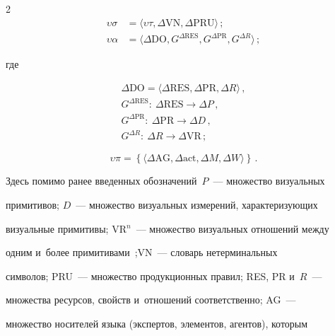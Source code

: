 \begin{multicols}{2}
\begin{align}
   \upsilon\sigma &= \langle \upsilon\tau, \Delta \mathrm{VN}, \Delta \mathrm{PRU}\rangle\,;\label{e8-ls}\\


   \upsilon\alpha &= \langle \Delta \mathrm{DO}, G^{\Delta \mathrm{RES}}, 


   G^{\Delta \mathrm{PR}}, G^{\Delta R}\rangle\,; 


\label{e9-ls}


\end{align}


где


\begin{gather*}


   \Delta \mathrm{DO} = \langle \Delta \mathrm{RES}, \Delta \mathrm{PR}, \Delta R\rangle\,, %


\\


G^{\Delta \mathrm{RES}}:\  \Delta \mathrm{RES}\to \Delta P\,,\\ 


   G^{\Delta \mathrm{PR}}:\ \Delta \mathrm{PR}\to \Delta D\,,\\


   G^{\Delta R}:\ \Delta R\to \Delta \mathrm{VR}\,;


\end{gather*}


   \begin{equation}


   \upsilon\pi = \left\{ \langle \Delta \mathrm{AG}, \Delta \mathrm{act}, \Delta M, \Delta W\rangle\right\}\,.


   \label{e12-ls}


   \end{equation}


Здесь помимо ранее введенных обозначений~$P$~--- множество визуальных 


примитивов; $D$~--- множест\-во визуальных измерений, характеризующих 


визуальные примитивы; VR$^n$~--- множество визуальных отношений между 


одним и~более примитивами~\cite{4-ls};\linebreak VN~--- словарь нетерминальных 


символов; PRU~--- множество продукционных правил; RES, PR и~$R$~--- 


множества ресурсов, свойств и~отношений соответственно; AG~--- 


множество носителей языка (экспер\-тов, элементов, агентов), которым 



\end{multicols}
